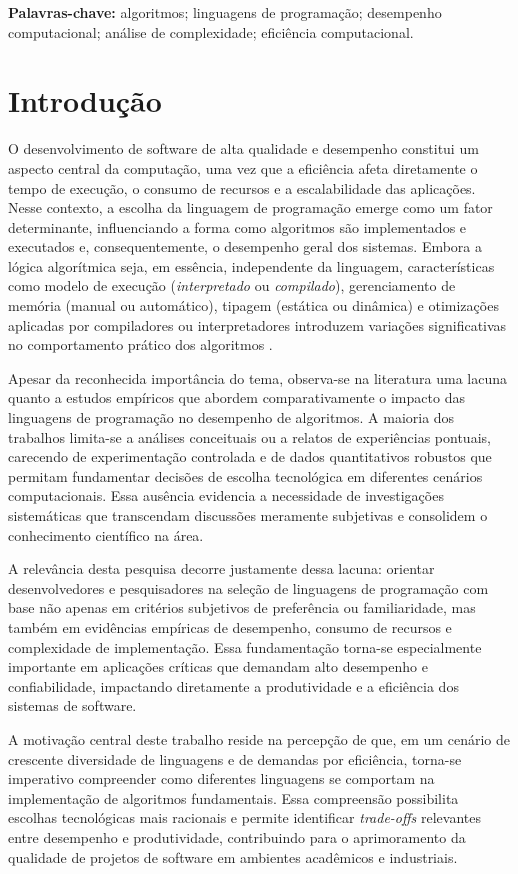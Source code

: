 \documentclass[12pt,a4paper]{article}
\newcommand{\eng}[1]{\textit{#1}}
\begin{document}
\noindent \textbf{Palavras-chave:} algoritmos; linguagens de programação; desempenho computacional; análise de complexidade; eficiência computacional.

\section{Introdução}

O desenvolvimento de software de alta qualidade e desempenho constitui um aspecto central da computação, uma vez que a eficiência afeta diretamente o tempo de execução, o consumo de recursos e a escalabilidade das aplicações. Nesse contexto, a escolha da linguagem de programação emerge como um fator determinante, influenciando a forma como algoritmos são implementados e executados e, consequentemente, o desempenho geral dos sistemas. Embora a lógica algorítmica seja, em essência, independente da linguagem, características como modelo de execução (\eng{interpretado} ou \eng{compilado}), gerenciamento de memória (manual ou automático), tipagem (estática ou dinâmica) e otimizações aplicadas por compiladores ou interpretadores introduzem variações significativas no comportamento prático dos algoritmos .

Apesar da reconhecida importância do tema, observa-se na literatura uma lacuna quanto a estudos empíricos que abordem comparativamente o impacto das linguagens de programação no desempenho de algoritmos. A maioria dos trabalhos limita-se a análises conceituais ou a relatos de experiências pontuais, carecendo de experimentação controlada e de dados quantitativos robustos que permitam fundamentar decisões de escolha tecnológica em diferentes cenários computacionais. Essa ausência evidencia a necessidade de investigações sistemáticas que transcendam discussões meramente subjetivas e consolidem o conhecimento científico na área.

A relevância desta pesquisa decorre justamente dessa lacuna: orientar desenvolvedores e pesquisadores na seleção de linguagens de programação com base não apenas em critérios subjetivos de preferência ou familiaridade, mas também em evidências empíricas de desempenho, consumo de recursos e complexidade de implementação. Essa fundamentação torna-se especialmente importante em aplicações críticas que demandam alto desempenho e confiabilidade, impactando diretamente a produtividade e a eficiência dos sistemas de software.

A motivação central deste trabalho reside na percepção de que, em um cenário de crescente diversidade de linguagens e de demandas por eficiência, torna-se imperativo compreender como diferentes linguagens se comportam na implementação de algoritmos fundamentais. Essa compreensão possibilita escolhas tecnológicas mais racionais e permite identificar \eng{trade-offs} relevantes entre desempenho e produtividade, contribuindo para o aprimoramento da qualidade de projetos de software em ambientes acadêmicos e industriais.
\end{document}
